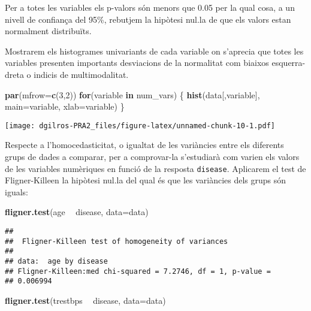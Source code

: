 \documentclass[12,]{article}
\newenvironment{Shaded}{\begin{snugshade}}{\end{snugshade}}
\newcommand{\ControlFlowTok}[1]{\textcolor[rgb]{0.13,0.29,0.53}{\textbf{#1}}}
\newcommand{\DataTypeTok}[1]{\textcolor[rgb]{0.13,0.29,0.53}{#1}}
\newcommand{\DecValTok}[1]{\textcolor[rgb]{0.00,0.00,0.81}{#1}}
\newcommand{\KeywordTok}[1]{\textcolor[rgb]{0.13,0.29,0.53}{\textbf{#1}}}
\newcommand{\NormalTok}[1]{#1}
\newcommand{\OperatorTok}[1]{\textcolor[rgb]{0.81,0.36,0.00}{\textbf{#1}}}
\newcommand{\StringTok}[1]{\textcolor[rgb]{0.31,0.60,0.02}{#1}}
\begin{document}
Per a totes les variables els p-valors són menors que 0.05 per la qual
cosa, a un nivell de confiança del 95\%, rebutjem la hipòtesi nul.la de
que els valors estan normalment distribuïts.

Mostrarem els histogrames univariants de cada variable on s'aprecia que
totes les variables presenten importants desviacions de la normalitat
com biaixos esquerra-dreta o indicis de multimodalitat.

\begin{Shaded}
\begin{Highlighting}[]
\KeywordTok{par}\NormalTok{(}\DataTypeTok{mfrow=}\KeywordTok{c}\NormalTok{(}\DecValTok{3}\NormalTok{,}\DecValTok{2}\NormalTok{))}
\ControlFlowTok{for}\NormalTok{(variable }\ControlFlowTok{in}\NormalTok{ num_vars) \{}
  \KeywordTok{hist}\NormalTok{(data[,variable], }\DataTypeTok{main=}\NormalTok{variable, }\DataTypeTok{xlab=}\NormalTok{variable)}
\NormalTok{\}}
\end{Highlighting}
\end{Shaded}

\texttt{[image: dgilros-PRA2\_files/figure-latex/unnamed-chunk-10-1.pdf]}

Respecte a l'homocedasticitat, o igualtat de les variàncies entre els
diferents grups de dades a comparar, per a comprovar-la s'estudiarà com
varien els valors de les variables numèriques en funció de la resposta
\texttt{disease}. Aplicarem el test de Fligner-Killeen la hipòtesi
nul.la del qual és que les variàncies dels grups són iguals:

\begin{Shaded}
\begin{Highlighting}[]
\KeywordTok{fligner.test}\NormalTok{(age }\OperatorTok{~}\StringTok{ }\NormalTok{disease, }\DataTypeTok{data=}\NormalTok{data)}
\end{Highlighting}
\end{Shaded}

\begin{verbatim}
## 
##  Fligner-Killeen test of homogeneity of variances
## 
## data:  age by disease
## Fligner-Killeen:med chi-squared = 7.2746, df = 1, p-value =
## 0.006994
\end{verbatim}

\begin{Shaded}
\begin{Highlighting}[]
\KeywordTok{fligner.test}\NormalTok{(trestbps }\OperatorTok{~}\StringTok{ }\NormalTok{disease, }\DataTypeTok{data=}\NormalTok{data)}
\end{Highlighting}
\end{Shaded}
\end{document}

